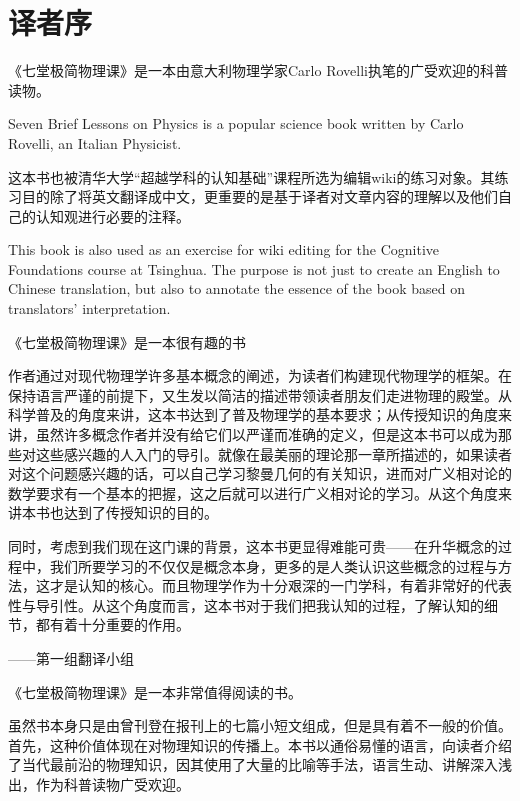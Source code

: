 	\chapter*{译者序}
	\indent

	

    《七堂极简物理课》是一本由意大利物理学家Carlo Rovelli执笔的广受欢迎的科普读物。
	
	Seven Brief Lessons on Physics is a popular science book written by Carlo Rovelli, an Italian Physicist.

	这本书也被清华大学“超越学科的认知基础”课程所选为编辑wiki的练习对象。其练习目的除了将英文翻译成中文，更重要的是基于译者对文章内容的理解以及他们自己的认知观进行必要的注释。
	
	This book is also used as an exercise for wiki editing for the Cognitive Foundations course at Tsinghua. The purpose is not just to create an English to Chinese translation, but also to annotate the essence of the book based on translators' interpretation.

	



   《七堂极简物理课》是一本很有趣的书

    作者通过对现代物理学许多基本概念的阐述，为读者们构建现代物理学的框架。在保持语言严谨的前提下，又生发以简洁的描述带领读者朋友们走进物理的殿堂。从科学普及的角度来讲，这本书达到了普及物理学的基本要求；从传授知识的角度来讲，虽然许多概念作者并没有给它们以严谨而准确的定义，但是这本书可以成为那些对这些感兴趣的人入门的导引。就像在最美丽的理论那一章所描述的，如果读者对这个问题感兴趣的话，可以自己学习黎曼几何的有关知识，进而对广义相对论的数学要求有一个基本的把握，这之后就可以进行广义相对论的学习。从这个角度来讲本书也达到了传授知识的目的。

    同时，考虑到我们现在这门课的背景，这本书更显得难能可贵——在升华概念的过程中，我们所要学习的不仅仅是概念本身，更多的是人类认识这些概念的过程与方法，这才是认知的核心。而且物理学作为十分艰深的一门学科，有着非常好的代表性与导引性。从这个角度而言，这本书对于我们把我认知的过程，了解认知的细节，都有着十分重要的作用。

                                                                                               ——第一组翻译小组


    《七堂极简物理课》是一本非常值得阅读的书。

    虽然书本身只是由曾刊登在报刊上的七篇小短文组成，但是具有着不一般的价值。首先，这种价值体现在对物理知识的传播上。本书以通俗易懂的语言，向读者介绍了当代最前沿的物理知识，因其使用了大量的比喻等手法，语言生动、讲解深入浅出，作为科普读物广受欢迎。

